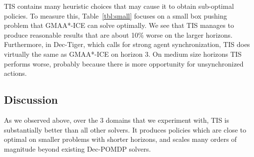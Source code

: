 \documentclass[runningheads]{llncs}
\newcommand{\eliran}[1]{\textbf{[\color{red}ELIRAN:#1]}}
\newcommand{\ronen}[1]{\textbf{[\color{blue}RONEN:#1]}}
\newcommand{\cbp}[0]{Collaborative Box-Pushing}
\begin{document}



TIS contains many heuristic choices that may cause it to obtain sub-optimal policies. To measure this, Table~\ref{tbl:small} focuses on a small box pushing problem that GMAA*-ICE can solve optimally. We see that TIS manages to produce reasonable results that are about 10\% worse on the larger horizons. Furthermore, in Dec-Tiger, which calls for strong agent synchronization, TIS does virtually 
the same as GMAA*-ICE on horizon 3. On medium size horizons TIS performs worse, probably because there is more opportunity for unsynchronized actions.

\subsection{Discussion}

As we  observed above, over the 3 domains that we experiment with, TIS is substantially better than all other solvers. It produces policies which are close to optimal on smaller problems with shorter horizons, and scales many orders of magnitude beyond existing Dec-POMDP solvers. 
\end{document}
